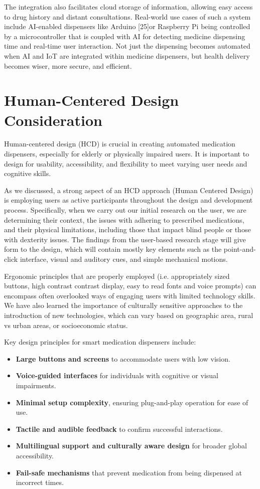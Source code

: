 The integration also facilitates cloud storage of information, allowing easy access to drug history and distant consultations. Real-world use cases of such a system include AI-enabled dispensers like Arduino [25]or Raspberry Pi being controlled by a microcontroller that is coupled with AI for detecting medicine dispensing time and real-time user interaction. Not just the dispensing becomes automated when AI and IoT are integrated within medicine dispensers, but health delivery becomes wiser, more secure, and efficient.


\section{Human-Centered Design Consideration}

Human-centered design (HCD) is crucial in creating automated medication dispensers, especially for elderly or physically impaired users. It is important to design for usability, accessibility, and flexibility to meet varying user needs and cognitive skills.

As we discussed, a strong aspect of an HCD approach (Human Centered Design) is employing users as active participants throughout the design and development process. Specifically, when we carry out our initial research on the user, we are determining their context, the issues with adhering to prescribed medications, and their physical limitations, including those that impact blind people or those with dexterity issues. The findings from the user-based research stage will give form to the design, which will contain mostly key elements such as the point-and-click interface, visual and auditory cues, and simple mechanical motions.

Ergonomic principles that are properly employed (i.e. appropriately sized buttons, high contrast contrast display, easy to read fonts and voice prompts) can encompass often overlooked ways of engaging users with limited technology skills. We have also learned the importance of culturally sensitive approaches to the introduction of new technologies, which can vary based on geographic area, rural vs urban areas, or socioeconomic status.



Key design principles for smart medication dispensers include:

\begin{itemize}
    \item \textbf{Large buttons and screens} to accommodate users with low vision.
    \item \textbf{Voice-guided interfaces} for individuals with cognitive or visual impairments.
    \item \textbf{Minimal setup complexity}, ensuring plug-and-play operation for ease of use.
    \item \textbf{Tactile and audible feedback} to confirm successful interactions.
    \item \textbf{Multilingual support and culturally aware design} for broader global accessibility.
    \item \textbf{Fail-safe mechanisms} that prevent medication from being dispensed at incorrect times.
\end{itemize}


